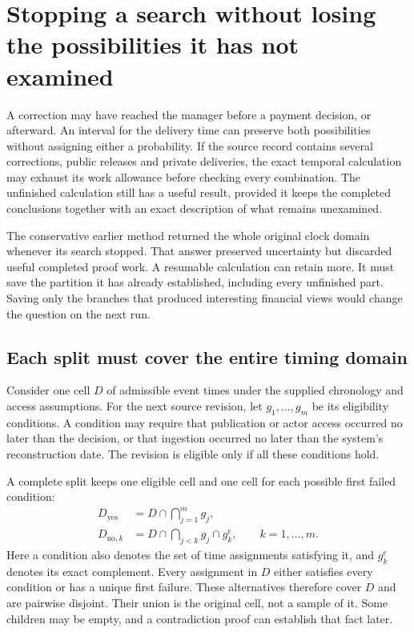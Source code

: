 \section{Stopping a search without losing the possibilities it has not examined}
\label{sim:temporal-frontier}

A correction may have reached the manager before a payment decision, or afterward. An interval for the delivery time can preserve both possibilities without assigning either a probability. If the source record contains several corrections, public releases and private deliveries, the exact temporal calculation may exhaust its work allowance before checking every combination. The unfinished calculation still has a useful result, provided it keeps the completed conclusions together with an exact description of what remains unexamined.

The conservative earlier method returned the whole original clock domain whenever its search stopped. That answer preserved uncertainty but discarded useful completed proof work. A resumable calculation can retain more. It must save the partition it has already established, including every unfinished part. Saving only the branches that produced interesting financial views would change the question on the next run.

\subsection{Each split must cover the entire timing domain}

Consider one cell $D$ of admissible event times under the supplied chronology and access assumptions. For the next source revision, let $g_1,\ldots,g_m$ be its eligibility conditions. A condition may require that publication or actor access occurred no later than the decision, or that ingestion occurred no later than the system's reconstruction date. The revision is eligible only if all these conditions hold.

A complete split keeps one eligible cell and one cell for each possible first failed condition:
\begin{align}
 D_{\mathrm{yes}} &= D\cap\bigcap_{j=1}^{m}g_j,\\
 D_{\mathrm{no},k} &= D\cap\bigcap_{j<k}g_j\cap g_k^{\mathrm c},
 \qquad k=1,\ldots,m.
\end{align}
Here a condition also denotes the set of time assignments satisfying it, and $g_k^{\mathrm c}$ denotes its exact complement. Every assignment in $D$ either satisfies every condition or has a unique first failure. These alternatives therefore cover $D$ and are pairwise disjoint. Their union is the original cell, not a sample of it. Some children may be empty, and a contradiction proof can establish that fact later.

